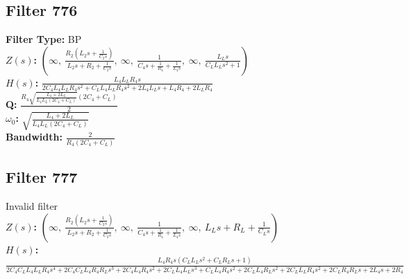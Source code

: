 \documentclass{article}
\begin{document}
\subsection*{Filter 776}
\textbf{Filter Type:} BP \\ 
\textbf{$Z(s)$:} $\left( \infty, \  \frac{R_{2} \left(L_{2} s + \frac{1}{C_{2} s}\right)}{L_{2} s + R_{2} + \frac{1}{C_{2} s}}, \  \infty, \  \frac{1}{C_{4} s + \frac{1}{R_{4}} + \frac{1}{L_{4} s}}, \  \infty, \  \frac{L_{L} s}{C_{L} L_{L} s^{2} + 1}\right)$ \\ 
\textbf{$H(s)$:} $\frac{L_{4} L_{L} R_{4} s}{2 C_{4} L_{4} L_{L} R_{4} s^{2} + C_{L} L_{4} L_{L} R_{4} s^{2} + 2 L_{4} L_{L} s + L_{4} R_{4} + 2 L_{L} R_{4}}$ \\ 
\textbf{Q:} $\frac{R_{4} \sqrt{\frac{L_{4} + 2 L_{L}}{L_{4} L_{L} \left(2 C_{4} + C_{L}\right)}} \left(2 C_{4} + C_{L}\right)}{2}$ \\ 
\textbf{$\omega_0$:} $\sqrt{\frac{L_{4} + 2 L_{L}}{L_{4} L_{L} \left(2 C_{4} + C_{L}\right)}}$ \\ 
\textbf{Bandwidth:} $\frac{2}{R_{4} \left(2 C_{4} + C_{L}\right)}$ \\ 
\subsection*{Filter 777}
Invalid filter \\ 
\textbf{$Z(s)$:} $\left( \infty, \  \frac{R_{2} \left(L_{2} s + \frac{1}{C_{2} s}\right)}{L_{2} s + R_{2} + \frac{1}{C_{2} s}}, \  \infty, \  \frac{1}{C_{4} s + \frac{1}{R_{4}} + \frac{1}{L_{4} s}}, \  \infty, \  L_{L} s + R_{L} + \frac{1}{C_{L} s}\right)$ \\ 
\textbf{$H(s)$:} $\frac{L_{4} R_{4} s \left(C_{L} L_{L} s^{2} + C_{L} R_{L} s + 1\right)}{2 C_{4} C_{L} L_{4} L_{L} R_{4} s^{4} + 2 C_{4} C_{L} L_{4} R_{4} R_{L} s^{3} + 2 C_{4} L_{4} R_{4} s^{2} + 2 C_{L} L_{4} L_{L} s^{3} + C_{L} L_{4} R_{4} s^{2} + 2 C_{L} L_{4} R_{L} s^{2} + 2 C_{L} L_{L} R_{4} s^{2} + 2 C_{L} R_{4} R_{L} s + 2 L_{4} s + 2 R_{4}}$ \\ 
\end{document}
